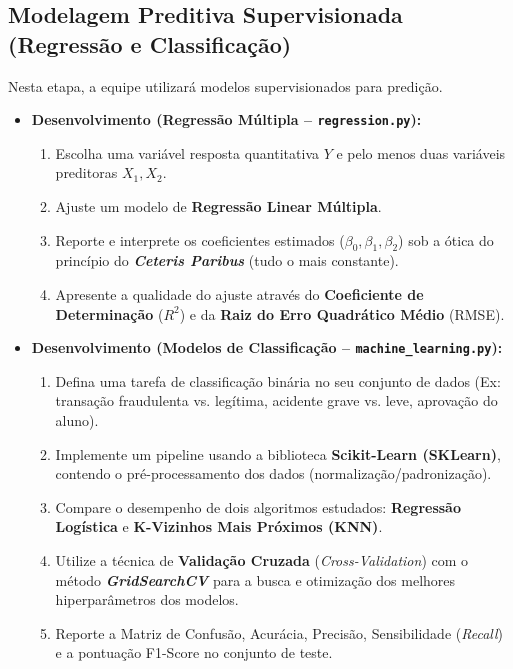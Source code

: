 \documentclass[12pt,a4paper]{article}
\begin{document}
		\subsection{Modelagem Preditiva Supervisionada (Regressão e Classificação)}
	Nesta etapa, a equipe utilizará modelos supervisionados para predição.
	\begin{itemize}
		\item \textbf{Desenvolvimento (Regressão Múltipla -- \texttt{regression.py}):}
		\begin{enumerate}
			\item Escolha uma variável resposta quantitativa $Y$ e pelo menos duas variáveis preditoras $X_1, X_2$.
			\item Ajuste um modelo de \textbf{Regressão Linear Múltipla}.
			\item Reporte e interprete os coeficientes estimados ($\beta_0, \beta_1, \beta_2$) sob a ótica do princípio do \textbf{\textit{Ceteris Paribus}} (tudo o mais constante).
			\item Apresente a qualidade do ajuste através do \textbf{Coeficiente de Determinação} ($R^2$) e da \textbf{Raiz do Erro Quadrático Médio} (RMSE).
		\end{enumerate}
		
		\item \textbf{Desenvolvimento (Modelos de Classificação -- \texttt{machine\_learning.py}):}
		\begin{enumerate}
			\item Defina uma tarefa de classificação binária no seu conjunto de dados (Ex: transação fraudulenta vs. legítima, acidente grave vs. leve, aprovação do aluno).
			\item Implemente um pipeline usando a biblioteca \textbf{Scikit-Learn (SKLearn)}, contendo o pré-processamento dos dados (normalização/padronização).
			\item Compare o desempenho de dois algoritmos estudados: \textbf{Regressão Logística} e \textbf{K-Vizinhos Mais Próximos (KNN)}.
			\item Utilize a técnica de \textbf{Validação Cruzada} (\textit{Cross-Validation}) com o método \textbf{\textit{GridSearchCV}} para a busca e otimização dos melhores hiperparâmetros dos modelos.
			\item Reporte a Matriz de Confusão, Acurácia, Precisão, Sensibilidade (\textit{Recall}) e a pontuação F1-Score no conjunto de teste.
		\end{enumerate}
	\end{itemize}
\end{document}
